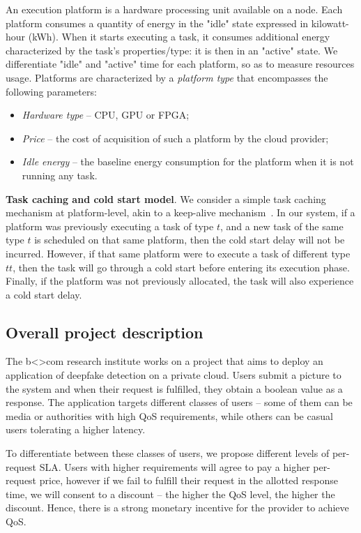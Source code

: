 An execution platform is a hardware processing unit available on a node. Each platform consumes a quantity of energy in the "idle" state expressed in kilowatt-hour (kWh). When it starts executing a task, it consumes additional energy characterized by the task's properties/type: it is then in an "active" state. We differentiate "idle" and "active" time for each platform, so as to measure resources usage.
Platforms are characterized by a \textit{platform type} that encompasses the following parameters:

\begin{itemize}
    \item \textit{Hardware type} -- CPU, GPU or FPGA;
    \item \textit{Price} -- the cost of acquisition of such a platform by the cloud provider;
    \item \textit{Idle energy} -- the baseline energy consumption for the platform when it is not running any task.
\end{itemize}

\textbf{Task caching and cold start model}. We consider a simple task caching mechanism at platform-level, akin to a keep-alive mechanism~\cite{7279063}. In our system, if a platform was previously executing a task of type $t$, and a new task of the same type $t$ is scheduled on that same platform, then the cold start delay will not be incurred. However, if that same platform were to execute a task of different type $tt$, then the task will go through a cold start before entering its execution phase. Finally, if the platform was not previously allocated, the task will also experience a cold start delay.

\subsection{Overall project description}

The b{\textless\textgreater}com research institute works on a project that aims to deploy an application of deepfake detection on a private cloud. Users submit a picture to the system and when their request is fulfilled, they obtain a boolean value as a response. The application targets different classes of users -- some of them can be media or authorities with high QoS requirements, while others can be casual users tolerating a higher latency.

To differentiate between these classes of users, we propose different levels of per-request SLA. Users with higher requirements will agree to pay a higher per-request price, however if we fail to fulfill their request in the allotted response time, we will consent to a discount -- the higher the QoS level, the higher the discount. Hence, there is a strong monetary incentive for the provider to achieve QoS.

